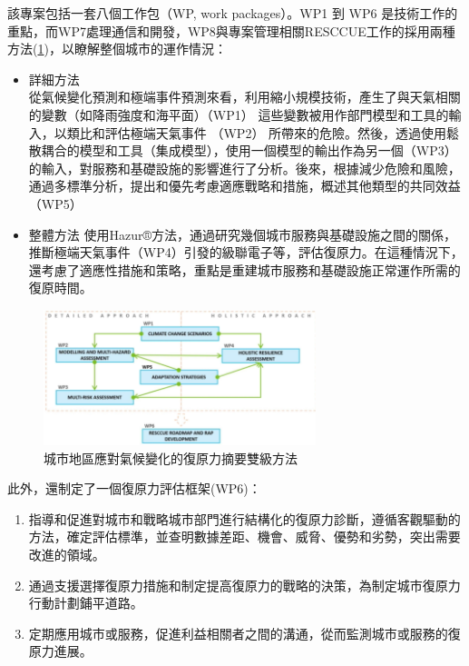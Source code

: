 \documentclass[a4paper,12pt]{article}
\begin{document}
\begin{enumerate}
該專案包括一套八個工作包（WP, work packages）。WP1 到 WP6 是技術工作的重點，而WP7處理通信和開發，WP8與專案管理相關RESCCUE工作的採用兩種方法(\ref{fig:Lisbon-WPs})，以瞭解整個城市的運作情況：\\
\begin{itemize}
\item 詳細方法\\
從氣候變化預測和極端事件預測來看，利用縮小規模技術，產生了與天氣相關的變數（如降雨強度和海平面）（WP1） 這些變數被用作部門模型和工具的輸入，以類比和評估極端天氣事件 （WP2） 所帶來的危險。然後，透過使用鬆散耦合的模型和工具（集成模型），使用一個模型的輸出作為另一個（WP3）的輸入，對服務和基礎設施的影響進行了分析。後來，根據減少危險和風險，通過多標準分析，提出和優先考慮適應戰略和措施，概述其他類型的共同效益（WP5）\\
\item 整體方法  使用Hazur®方法，通過研究幾個城市服務與基礎設施之間的關係，推斷極端天氣事件（WP4）引發的級聯電子等，評估復原力。在這種情況下，還考慮了適應性措施和策略，重點是重建城市服務和基礎設施正常運作所需的復原時間。\\
\end{itemize}
\begin{figure}[htbp]
\centering
\includegraphics[width=300]{images/blwp.png}
\caption{\label{fig:Lisbon-WPs}城市地區應對氣候變化的復原力摘要雙級方法}
\end{figure}

此外，還制定了一個復原力評估框架(WP6)：\\
\begin{enumerate}
\item 指導和促進對城市和戰略城市部門進行結構化的復原力診斷，遵循客觀驅動的方法，確定評估標準，並查明數據差距、機會、威脅、優勢和劣勢，突出需要改進的領域。\\
\item 通過支援選擇復原力措施和制定提高復原力的戰略的決策，為制定城市復原力行動計劃鋪平道路。\\
\item 定期應用城市或服務，促進利益相關者之間的溝通，從而監測城市或服務的復原力進展。\\
\end{enumerate}


\end{enumerate}
\end{document}
